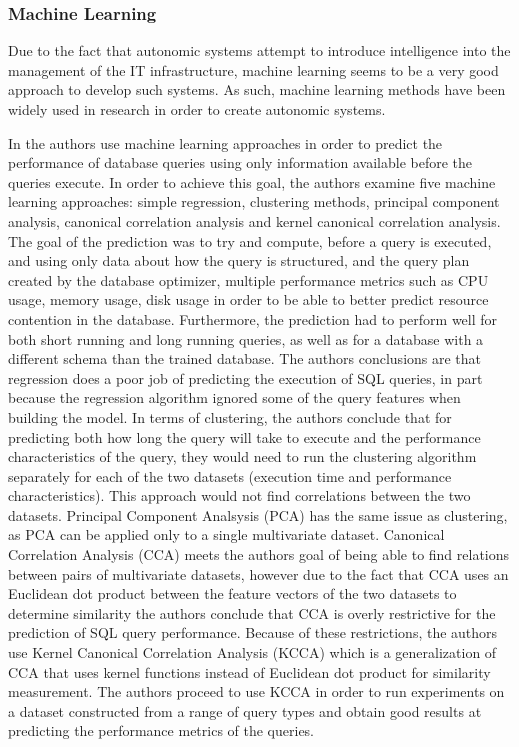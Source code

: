 \subsubsection{Machine Learning}

Due to the fact that autonomic systems attempt to introduce intelligence into the management of the IT infrastructure, machine learning seems to be a very good approach to develop such systems. As such, machine learning methods have been widely used in research in order to create autonomic systems. 

In \cite{related:mldb} the authors use machine learning approaches in order to predict the performance of database queries using only information available before the queries execute. In order to achieve this goal, the authors examine five machine learning approaches: simple regression, clustering methods, principal component analysis, canonical correlation analysis and kernel canonical correlation analysis. The goal of the prediction was to try and compute, before a query is executed, and using only data about how the query is structured, and the query plan created by the database optimizer, multiple performance metrics such as CPU usage, memory usage, disk usage in order to be able to better predict resource contention in the database. Furthermore, the prediction had to perform well for both short running and long running queries, as well as for a database with a different schema than the trained database. The authors conclusions are that regression does a poor job of predicting the execution of SQL queries, in part because the regression algorithm ignored some of the query features when building the model. In terms of clustering, the authors conclude that for predicting both how long the query will take to execute and the performance characteristics of the query, they would need to run the clustering algorithm separately for each of the two datasets (execution time and performance characteristics). This approach would not find correlations between the two datasets. Principal Component Analsysis (PCA) has the same issue as clustering, as PCA can be applied only to a single multivariate dataset. Canonical Correlation Analysis (CCA) meets the authors goal of being able to find relations between pairs of multivariate datasets, however due to the fact that CCA uses an Euclidean dot product between the feature vectors of the two datasets to determine similarity the authors conclude that CCA is overly restrictive for the prediction of SQL query performance. Because of these restrictions, the authors use Kernel Canonical Correlation Analysis (KCCA) which is a generalization of CCA that uses kernel functions instead of Euclidean dot product for similarity measurement. The authors proceed to use KCCA in order to run experiments on a dataset constructed from a range of query types and obtain good results at predicting the performance metrics of the queries. 

